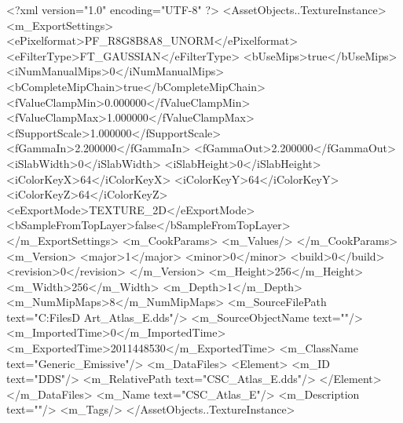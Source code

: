 <?xml version="1.0" encoding="UTF-8" ?>
<AssetObjects..TextureInstance>
	<m_ExportSettings>
		<ePixelformat>PF_R8G8B8A8_UNORM</ePixelformat>
		<eFilterType>FT_GAUSSIAN</eFilterType>
		<bUseMips>true</bUseMips>
		<iNumManualMips>0</iNumManualMips>
		<bCompleteMipChain>true</bCompleteMipChain>
		<fValueClampMin>0.000000</fValueClampMin>
		<fValueClampMax>1.000000</fValueClampMax>
		<fSupportScale>1.000000</fSupportScale>
		<fGammaIn>2.200000</fGammaIn>
		<fGammaOut>2.200000</fGammaOut>
		<iSlabWidth>0</iSlabWidth>
		<iSlabHeight>0</iSlabHeight>
		<iColorKeyX>64</iColorKeyX>
		<iColorKeyY>64</iColorKeyY>
		<iColorKeyZ>64</iColorKeyZ>
		<eExportMode>TEXTURE_2D</eExportMode>
		<bSampleFromTopLayer>false</bSampleFromTopLayer>
	</m_ExportSettings>
	<m_CookParams>
		<m_Values/>
	</m_CookParams>
	<m_Version>
		<major>1</major>
		<minor>0</minor>
		<build>0</build>
		<revision>0</revision>
	</m_Version>
	<m_Height>256</m_Height>
	<m_Width>256</m_Width>
	<m_Depth>1</m_Depth>
	<m_NumMipMaps>8</m_NumMipMaps>
	<m_SourceFilePath text="C:\Users\Shadow\Desktop\Working Files\3D Art\Textures\CSC_Atlas_E.dds"/>
	<m_SourceObjectName text=""/>
	<m_ImportedTime>0</m_ImportedTime>
	<m_ExportedTime>2011448530</m_ExportedTime>
	<m_ClassName text="Generic_Emissive"/>
	<m_DataFiles>
		<Element>
			<m_ID text="DDS"/>
			<m_RelativePath text="CSC_Atlas_E.dds"/>
		</Element>
	</m_DataFiles>
	<m_Name text="CSC_Atlas_E"/>
	<m_Description text=""/>
	<m_Tags/>
</AssetObjects..TextureInstance>

